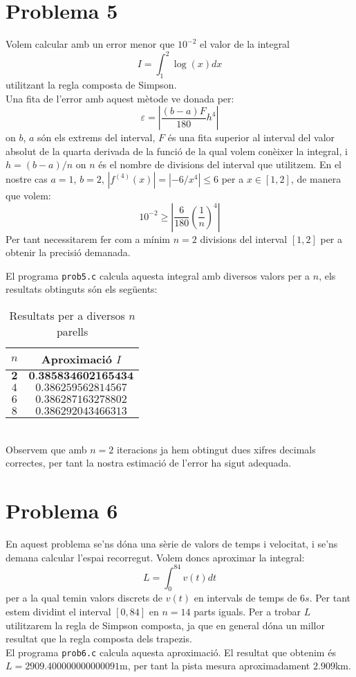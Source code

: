 \documentclass[12pt]{article}
\numberwithin{table}{section}
\numberwithin{figure}{section}
\numberwithin{equation}{section}
\begin{document}
\newpage
\section{Problema 5}
Volem calcular amb un error menor que $10^{-2}$ el valor de la integral
$$I=\int_{1}^{2}\log(x)dx$$
utilitzant la regla composta de Simpson.\\

Una fita de l'error amb aquest mètode ve donada per:
$$\varepsilon=\left|\dfrac{(b-a)F}{180}h^4 \right| $$
on $b$, $a$ són els extrems del interval, $F$ és una fita superior al interval del valor absolut de la quarta derivada de la funció de la qual volem conèixer la integral, i $h=(b-a)/n$ on $n$ és el nombre de divisions del interval que utilitzem. En el nostre cas $a=1$, $b=2$, $|f^{(4)}(x)|=|-6/x^4|\leq6$ per a $x\in[1,2]$, de manera que volem:
$$10^{-2}\geq\left| \frac{6}{180}\left( \dfrac{1}{n}\right)^4 \right| $$
Per tant necessitarem fer com a mínim $n=2$ divisions del interval $[1,2]$ per a obtenir la precisió demanada.

El programa \texttt{prob5.c} calcula aquesta integral amb diversos valors per a $n$, els resultats obtinguts són els següents:
\begin{table}[h!]
	\centering
	\caption{Resultats per a diversos $n$ parells}	
	\begin{tabular}{c|c}
		$n$ & Aproximació $I$\\
		\hline
		\hline
		$\textbf{2}$ & $\textbf{0.385834602165434}$  \\
		$4$ & $0.386259562814567$ \\
		$6$ & $0.386287163278802$ \\
		$8$ & $0.386292043466313$ \\
	\end{tabular}
\end{table}\\
Observem que amb $n=2$ iteracions ja hem obtingut dues xifres decimals correctes, per tant la nostra estimació de l'error ha sigut adequada.

\newpage
\section{Problema 6}
En aquest problema se'ns dóna una sèrie de valors de temps i velocitat, i se'ns demana calcular l'espai recorregut. Volem doncs aproximar la integral:
$$L=\int_{0}^{84}v(t)dt$$
per a la qual temin valors discrets de $v(t)$ en intervals de temps de $6s$. Per tant estem dividint el interval $[0,84]$ en $n=14$ parts iguals. Per a trobar $L$ utilitzarem la regla de Simpson composta, ja que en general dóna un millor resultat que la regla composta dels trapezis. \\

El programa \texttt{prob6.c} calcula aquesta aproximació. El resultat que obtenim és $L=2909.400000000000091$m, per tant la pista mesura aproximadament $2.909$km.
\end{document}
